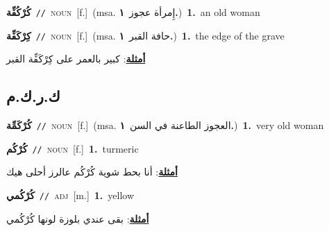 \documentclass[10pt,a4paper,twoside]{article} %
\begin{document}
\begin{multicols}{2}
{\setlength\topsep{0pt}\textbf{\foreignlanguage{arabic}{كُرْكُفِّة}}\ {\color{gray}\texttt{//}\color{black}}\ \textsc{noun}\ [f.]\ \color{gray}(msa. \foreignlanguage{arabic}{إِمرأة عجوز}~\foreignlanguage{arabic}{\textbf{١.}})\color{black}\ \textbf{1.}~an old woman\ } \vspace{2mm}

{\setlength\topsep{0pt}\textbf{\foreignlanguage{arabic}{كِرْكَفِّة}}\ {\color{gray}\texttt{//}\color{black}}\ \textsc{noun}\ [f.]\ \color{gray}(msa. \foreignlanguage{arabic}{حافة القبر}~\foreignlanguage{arabic}{\textbf{١.}})\color{black}\ \textbf{1.}~the edge of the grave\  \begin{flushright}\color{gray}\foreignlanguage{arabic}{\textbf{\underline{\foreignlanguage{arabic}{أمثلة}}}: كبير بالعمر على كِرْكَفِّة القبر}\end{flushright}\color{black}} \vspace{2mm}

\vspace{-3mm}
\subsection*{\color{blue}\foreignlanguage{arabic}{ك.ر.ك.م}\color{blue}{}} 

{\setlength\topsep{0pt}\textbf{\foreignlanguage{arabic}{كُرْكَمِّة}}\ {\color{gray}\texttt{//}\color{black}}\ \textsc{noun}\ [f.]\ \color{gray}(msa. \foreignlanguage{arabic}{العجوز الطاعنة في السن}~\foreignlanguage{arabic}{\textbf{١.}})\color{black}\ \textbf{1.}~very old woman\ } \vspace{2mm}

{\setlength\topsep{0pt}\textbf{\foreignlanguage{arabic}{كُرْكُم}}\ {\color{gray}\texttt{//}\color{black}}\ \textsc{noun}\ [f.]\ \textbf{1.}~turmeric\  \begin{flushright}\color{gray}\foreignlanguage{arabic}{\textbf{\underline{\foreignlanguage{arabic}{أمثلة}}}: أنا بحط شوية كُرْكُم عالرز أحلى هيك}\end{flushright}\color{black}} \vspace{2mm}

{\setlength\topsep{0pt}\textbf{\foreignlanguage{arabic}{كُرْكُمي}}\ {\color{gray}\texttt{//}\color{black}}\ \textsc{adj}\ [m.]\ \textbf{1.}~yellow\  \begin{flushright}\color{gray}\foreignlanguage{arabic}{\textbf{\underline{\foreignlanguage{arabic}{أمثلة}}}: بقى عندي بلوزة لونها كُرْكُمي}\end{flushright}\color{black}} \vspace{2mm}


\end{multicols}
\end{document}
